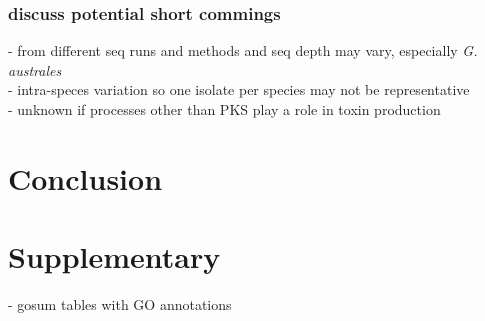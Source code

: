 \documentclass[12pt]{article}
\begin{document}
\subsubsection*{discuss potential short commings} 
- from different seq runs and methods and seq depth may vary, especially \textit{G. australes} \\
- intra-speces variation so one isolate per species may not be representative \\
- unknown if processes other than PKS play a role in toxin production

\section*{Conclusion}


\section*{Supplementary}
- gosum tables with GO annotations
\end{document}

